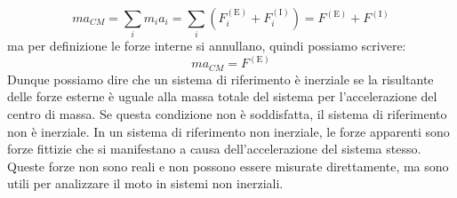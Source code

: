     $$
        ma_{CM} = \sum_{i} m_ia_i = \sum_{i} \left(F_i^{(\text{E})} + F_i^{(\text{I})}\right) = F^{(\text{E})} + F^{(\text{I})}
    $$
    ma per definizione le forze interne si annullano, quindi possiamo scrivere:
    $$
        ma_{CM} = F^{(\text{E})}
    $$
    Dunque possiamo dire che un sistema di riferimento è inerziale se la risultante delle forze esterne è uguale alla massa totale del sistema per l'accelerazione del centro di massa. Se questa condizione non è soddisfatta, il sistema di riferimento non è inerziale. In un sistema di riferimento non inerziale, le forze apparenti sono forze fittizie che si manifestano a causa dell'accelerazione del sistema stesso. Queste forze non sono reali e non possono essere misurate direttamente, ma sono utili per analizzare il moto in sistemi non inerziali.